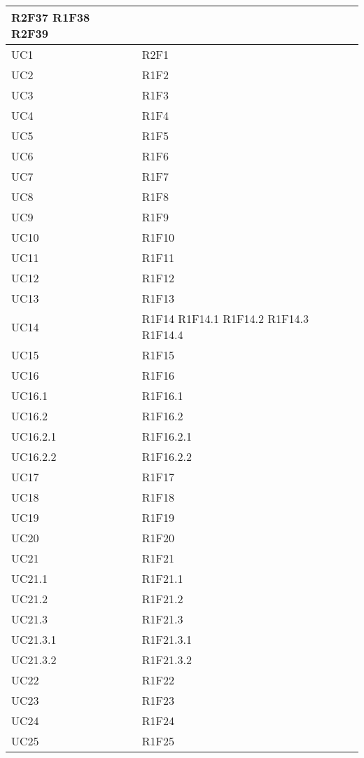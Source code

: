 \begin{center}
\begin{longtable}{|p{44mm}|p{22mm}|}
R2F37 \newline
R1F38 \newline
R2F39 
\\
\hline
UC1 &
R2F1 
\\
\hline
UC2 &
R1F2 
\\
\hline
UC3 &
R1F3 
\\
\hline
UC4 &
R1F4 
\\
\hline
UC5 &
R1F5 
\\
\hline
UC6 &
R1F6 
\\
\hline
UC7 &
R1F7 
\\
\hline
UC8 &
R1F8 
\\
\hline
UC9 &
R1F9 
\\
\hline
UC10 &
R1F10 
\\
\hline
UC11 &
R1F11 
\\
\hline
UC12 &
R1F12 
\\
\hline
UC13 &
R1F13 
\\
\hline
UC14 &
R1F14 \newline
R1F14.1 \newline
R1F14.2 \newline
R1F14.3 \newline
R1F14.4 
\\
\hline
UC15 &
R1F15 
\\
\hline
UC16 &
R1F16 
\\
\hline
UC16.1 &
R1F16.1 
\\
\hline
UC16.2 &
R1F16.2 
\\
\hline
UC16.2.1 &
R1F16.2.1 
\\
\hline
UC16.2.2 &
R1F16.2.2 
\\
\hline
UC17 &
R1F17 
\\
\hline
UC18 &
R1F18 
\\
\hline
UC19 &
R1F19 
\\
\hline
UC20 &
R1F20 
\\
\hline
UC21 &
R1F21 
\\
\hline
UC21.1 &
R1F21.1 
\\
\hline
UC21.2 &
R1F21.2 
\\
\hline
UC21.3 &
R1F21.3 
\\
\hline
UC21.3.1 &
R1F21.3.1 
\\
\hline
UC21.3.2 &
R1F21.3.2 
\\
\hline
UC22 &
R1F22 
\\
\hline
UC23 &
R1F23 
\\
\hline
UC24 &
R1F24 
\\
\hline
UC25 &
R1F25 
\\
\hline

\end{longtable}
\end{center}
